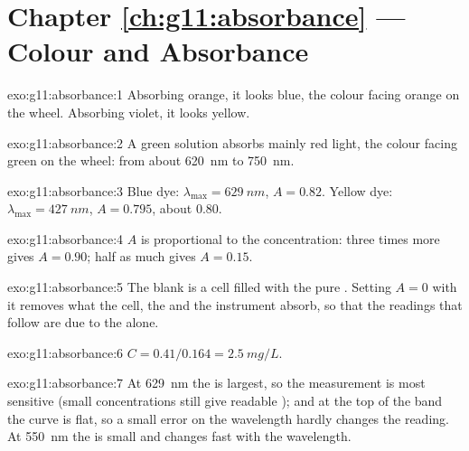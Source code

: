 \section*{Chapter \ref{ch:g11:absorbance} --- Colour and Absorbance}

\begin{solution}{exo:g11:absorbance:1}
Absorbing orange, it looks blue, the colour facing orange on the wheel.
Absorbing violet, it looks yellow.
\end{solution}

\begin{solution}{exo:g11:absorbance:2}
A green solution absorbs mainly red light, the colour facing green on
the wheel: from about \qty{620}{nm} to \qty{750}{nm}.
\end{solution}

\begin{solution}{exo:g11:absorbance:3}
Blue dye: $\lambda_{\max} = \qty{629}{nm}$, $A = 0.82$. Yellow dye:
$\lambda_{\max} = \qty{427}{nm}$, $A = 0.795$, about 0.80.
\end{solution}

\begin{solution}{exo:g11:absorbance:4}
$A$ is proportional to the concentration: three times more gives
$A = 0.90$; half as much gives $A = 0.15$.
\end{solution}

\begin{solution}{exo:g11:absorbance:5}
The blank is a cell filled with the pure . Setting $A = 0$ with it
removes what the cell, the  and the instrument absorb, so that
the readings that follow are due to the  alone.
\end{solution}

\begin{solution}{exo:g11:absorbance:6}
$C = 0.41 / 0.164 = \qty{2.5}{mg/L}$.
\end{solution}

\begin{solution}{exo:g11:absorbance:7}
At \qty{629}{nm} the  is largest, so the measurement is most
sensitive (small concentrations still give readable ); and at
the top of the band the curve is flat, so a small error on the wavelength
hardly changes the reading. At \qty{550}{nm} the  is small and
changes fast with the wavelength.
\end{solution}

